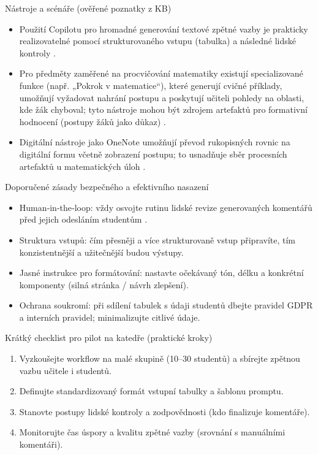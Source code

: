 Nástroje a scénáře (ověřené poznatky z KB)
\begin{itemize}
  \item Použití Copilotu pro hromadné generování textové zpětné vazby je prakticky realizovatelné pomocí strukturovaného vstupu (tabulka) a následné lidské kontroly \cite{kb_ai_101_tipu_pdf_04e4a115_page_21_2}.
  \item Pro předměty zaměřené na procvičování matematiky existují specializované funkce (např. „Pokrok v matematice“), které generují cvičné příklady, umožňují vyžadovat nahrání postupu a poskytují učiteli pohledy na oblasti, kde žák chyboval; tyto nástroje mohou být zdrojem artefaktů pro formativní hodnocení (postupy žáků jako důkaz) \cite{kb_ai_101_tipu_pdf_04e4a115_page_8_1}.
  \item Digitální nástroje jako OneNote umožňují převod rukopisných rovnic na digitální formu včetně zobrazení postupu; to usnadňuje sběr procesních artefaktů u matematických úloh \cite{kb_ai_101_tipu_pdf_04e4a115_page_8_1}.
\end{itemize}

Doporučené zásady bezpečného a efektivního nasazení
\begin{itemize}
  \item Human‑in‑the‑loop: vždy osvojte rutinu lidské revize generovaných komentářů před jejich odesláním studentům \cite{kb_ai_101_tipu_pdf_04e4a115_page_21_2}.
  \item Struktura vstupů: čím přesněji a více strukturovaně vstup připravíte, tím konzistentnější a užitečnější budou výstupy.
  \item Jasné instrukce pro formátování: nastavte očekávaný tón, délku a konkrétní komponenty (silná stránka / návrh zlepšení).
  \item Ochrana soukromí: při sdílení tabulek s údaji studentů dbejte pravidel GDPR a interních pravidel; minimalizujte citlivé údaje.
\end{itemize}

Krátký checklist pro pilot na katedře (praktické kroky)
\begin{enumerate}
  \item Vyzkoušejte workflow na malé skupině (10–30 studentů) a sbírejte zpětnou vazbu učitele i studentů.
  \item Definujte standardizovaný formát vstupní tabulky a šablonu promptu.
  \item Stanovte postupy lidské kontroly a zodpovědnosti (kdo finalizuje komentáře).
  \item Monitorujte čas úspory a kvalitu zpětné vazby (srovnání s manuálními komentáři).
\end{enumerate}

